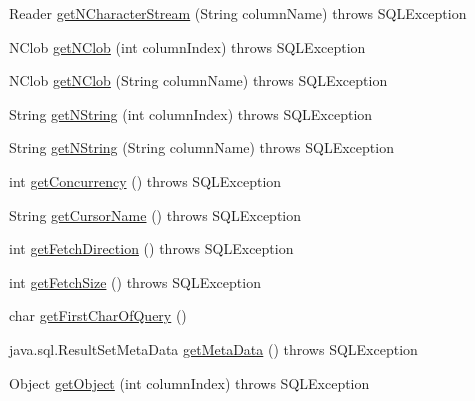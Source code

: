 \begin{DoxyCompactItemize}
\item 
Reader \mbox{\hyperlink{classcom_1_1mysql_1_1cj_1_1jdbc_1_1result_1_1_result_set_impl_a9c5ff18931b50a048bc91125ac8d9756}{get\+N\+Character\+Stream}} (String column\+Name)  throws S\+Q\+L\+Exception 
\item 
N\+Clob \mbox{\hyperlink{classcom_1_1mysql_1_1cj_1_1jdbc_1_1result_1_1_result_set_impl_a2d8f0a9320a523bab8207a44f9bca912}{get\+N\+Clob}} (int column\+Index)  throws S\+Q\+L\+Exception 
\item 
N\+Clob \mbox{\hyperlink{classcom_1_1mysql_1_1cj_1_1jdbc_1_1result_1_1_result_set_impl_af42a2e37e678c6e5dbbd27ffbb84aff5}{get\+N\+Clob}} (String column\+Name)  throws S\+Q\+L\+Exception 
\item 
String \mbox{\hyperlink{classcom_1_1mysql_1_1cj_1_1jdbc_1_1result_1_1_result_set_impl_a2ebe0ca3240595aca6946bcf24bc858e}{get\+N\+String}} (int column\+Index)  throws S\+Q\+L\+Exception 
\item 
String \mbox{\hyperlink{classcom_1_1mysql_1_1cj_1_1jdbc_1_1result_1_1_result_set_impl_a1ba791221fdb9fdb3205ff4a03513c8a}{get\+N\+String}} (String column\+Name)  throws S\+Q\+L\+Exception 
\item 
int \mbox{\hyperlink{classcom_1_1mysql_1_1cj_1_1jdbc_1_1result_1_1_result_set_impl_ab61f970f529c650b387801c7b5564a04}{get\+Concurrency}} ()  throws S\+Q\+L\+Exception 
\item 
String \mbox{\hyperlink{classcom_1_1mysql_1_1cj_1_1jdbc_1_1result_1_1_result_set_impl_ae9a387debe813452e883eaad4380fbfa}{get\+Cursor\+Name}} ()  throws S\+Q\+L\+Exception 
\item 
int \mbox{\hyperlink{classcom_1_1mysql_1_1cj_1_1jdbc_1_1result_1_1_result_set_impl_a78439a9f748a97fbf055e26fc73b8d13}{get\+Fetch\+Direction}} ()  throws S\+Q\+L\+Exception 
\item 
int \mbox{\hyperlink{classcom_1_1mysql_1_1cj_1_1jdbc_1_1result_1_1_result_set_impl_a1369ad7032b0cb985abbaf9db0f21b6d}{get\+Fetch\+Size}} ()  throws S\+Q\+L\+Exception 
\item 
char \mbox{\hyperlink{classcom_1_1mysql_1_1cj_1_1jdbc_1_1result_1_1_result_set_impl_aa660f8429c96f057e5c3046f32a06a18}{get\+First\+Char\+Of\+Query}} ()
\item 
java.\+sql.\+Result\+Set\+Meta\+Data \mbox{\hyperlink{classcom_1_1mysql_1_1cj_1_1jdbc_1_1result_1_1_result_set_impl_a5dfbd232f08f23825a1d665009b1070a}{get\+Meta\+Data}} ()  throws S\+Q\+L\+Exception 
\item 
Object \mbox{\hyperlink{classcom_1_1mysql_1_1cj_1_1jdbc_1_1result_1_1_result_set_impl_a4edc602009874dca9e0ff1956053e74f}{get\+Object}} (int column\+Index)  throws S\+Q\+L\+Exception 

\end{DoxyCompactItemize}
